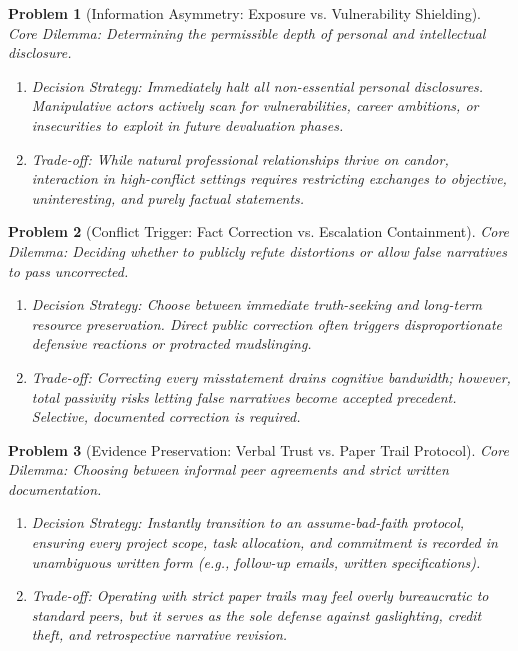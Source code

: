 \documentclass{article}
\newtheorem{problem}{Problem}
\begin{document}
\begin{problem}[Information Asymmetry: Exposure vs. Vulnerability Shielding]
	\emph{Core Dilemma:} Determining the permissible depth of personal and intellectual disclosure.
	\begin{enumerate}[label=(\roman*)]
		\item \emph{Decision Strategy:} Immediately halt all non-essential personal disclosures. Manipulative actors actively scan for vulnerabilities, career ambitions, or insecurities to exploit in future devaluation phases.
		\item \emph{Trade-off:} While natural professional relationships thrive on candor, interaction in high-conflict settings requires restricting exchanges to objective, uninteresting, and purely factual statements.
	\end{enumerate}
\end{problem}

\begin{problem}[Conflict Trigger: Fact Correction vs. Escalation Containment]
	\emph{Core Dilemma:} Deciding whether to publicly refute distortions or allow false narratives to pass uncorrected.
	\begin{enumerate}[label=(\roman*)]
		\item \emph{Decision Strategy:} Choose between immediate truth-seeking and long-term resource preservation. Direct public correction often triggers disproportionate defensive reactions or protracted mudslinging.
		\item \emph{Trade-off:} Correcting every misstatement drains cognitive bandwidth; however, total passivity risks letting false narratives become accepted precedent. Selective, documented correction is required.
	\end{enumerate}
\end{problem}

\begin{problem}[Evidence Preservation: Verbal Trust vs. Paper Trail Protocol]
	\emph{Core Dilemma:} Choosing between informal peer agreements and strict written documentation.
	\begin{enumerate}[label=(\roman*)]
		\item \emph{Decision Strategy:} Instantly transition to an \textit{assume-bad-faith protocol}, ensuring every project scope, task allocation, and commitment is recorded in unambiguous written form (e.g., follow-up emails, written specifications).
		\item \emph{Trade-off:} Operating with strict paper trails may feel overly bureaucratic to standard peers, but it serves as the sole defense against gaslighting, credit theft, and retrospective narrative revision.
	\end{enumerate}
\end{problem}
\end{document}

